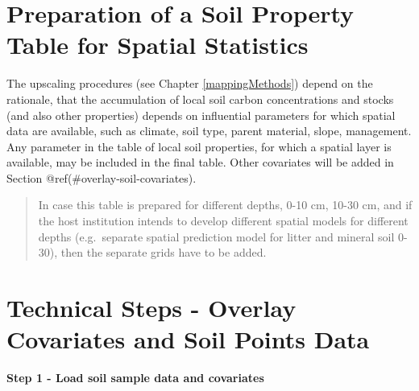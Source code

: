 \documentclass[10pt,b5paper,]{book}
\newenvironment{Shaded}{\begin{snugshade}}{\end{snugshade}}
\newcommand{\CommentTok}[1]{\textcolor[rgb]{0.56,0.35,0.01}{\textit{#1}}}
\newcommand{\DataTypeTok}[1]{\textcolor[rgb]{0.13,0.29,0.53}{#1}}
\newcommand{\KeywordTok}[1]{\textcolor[rgb]{0.13,0.29,0.53}{\textbf{#1}}}
\newcommand{\NormalTok}[1]{#1}
\newcommand{\OtherTok}[1]{\textcolor[rgb]{0.56,0.35,0.01}{#1}}
\newcommand{\StringTok}[1]{\textcolor[rgb]{0.31,0.60,0.02}{#1}}
\theoremstyle{definition}
\theoremstyle{definition}
\theoremstyle{definition}
\theoremstyle{remark}
\begin{document}
\hypertarget{preparation-of-a-soil-property-table-for-spatial-statistics}{%
\section{Preparation of a Soil Property Table for Spatial
Statistics}\label{preparation-of-a-soil-property-table-for-spatial-statistics}}

The upscaling procedures (see Chapter \ref{mappingMethods}) depend on
the rationale, that the accumulation of local soil carbon concentrations
and stocks (and also other properties) depends on influential parameters
for which spatial data are available, such as climate, soil type, parent
material, slope, management. Any parameter in the table of local soil
properties, for which a spatial layer is available, may be included in
the final table. Other covariates will be added in Section
@ref(\#overlay-soil-covariates).

\begin{quote}
In case this table is prepared for different depths, 0-10 cm, 10-30 cm,
and if the host institution intends to develop different spatial models
for different depths (e.g.~separate spatial prediction model for litter
and mineral soil 0-30), then the separate grids have to be added.
\end{quote}

\hypertarget{overlay-soil-covariates}{%
\section{Technical Steps - Overlay Covariates and Soil Points
Data}\label{overlay-soil-covariates}}

\textbf{Step 1 - Load soil sample data and covariates}

\begin{Shaded}
\end{Shaded}
\end{document}
